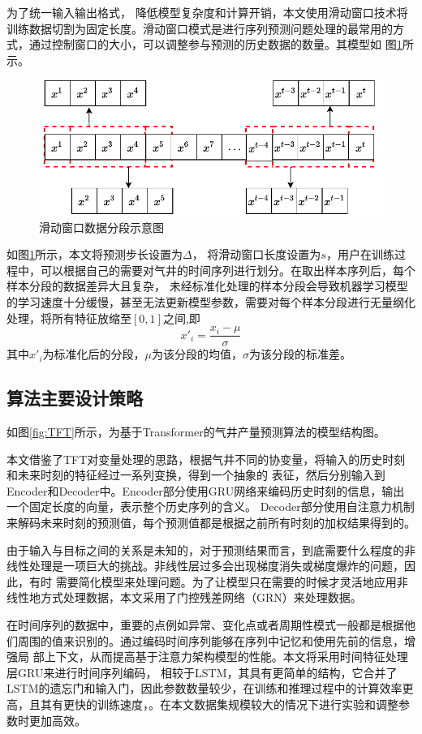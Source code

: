 为了统一输入输出格式，
降低模型复杂度和计算开销，本文使用滑动窗口技术将
训练数据切割为固定长度。滑动窗口模式是进行序列预测问题处理的最常用的方式，通过控制窗口的大小，可以调整参与预测的历史数据的数量。其模型如
图\ref{fig:slidewindow}所示。
\begin{figure}[H]
    \centering
    \includegraphics{figure/滑动窗口.vision.pdf}
    \caption{滑动窗口数据分段示意图}
    \label{fig:slidewindow}
\end{figure}
如图\ref{fig:slidewindow}所示，本文将预测步长设置为$\varDelta$， 将滑动窗口长度设置为$s$，用户在训练过程中，可以根据自己的需要对气井的时间序列进行划分。在取出样本序列后，每个样本分段的数据差异大且复杂，
未经标准化处理的样本分段会导致机器学习模型的学习速度十分缓慢，甚至无法更新模型参数，需要对每个样本分段进行无量纲化处理，将所有特征放缩至$[0,1]$之间,即
\begin{equation}
    x'_i = \frac{x_i - \mu}{\sigma}
\end{equation}
其中$x'_i$为标准化后的分段，$\mu$为该分段的均值，$\sigma$为该分段的标准差。
\subsection{算法主要设计策略}
如图\ref{fig:TFT}所示，为基于Transformer的气井产量预测算法的模型结构图。

本文借鉴了TFT对变量处理的思路，根据气井不同的协变量，将输入的历史时刻和未来时刻的特征经过一系列变换，得到一个抽象的
表征，然后分别输入到Encoder和Decoder中。Encoder部分使用GRU网络来编码历史时刻的信息，输出一个固定长度的向量，表示整个历史序列的含义。
Decoder部分使用自注意力机制来解码未来时刻的预测值，每个预测值都是根据之前所有时刻的加权结果得到的。

由于输入与目标之间的关系是未知的，对于预测结果而言，到底需要什么程度的非线性处理是一项巨大的挑战。非线性层过多会出现梯度消失或梯度爆炸的问题，因此，有时
需要简化模型来处理问题。为了让模型只在需要的时候才灵活地应用非线性地方式处理数据，本文采用了门控残差网络（GRN）来处理数据。

在时间序列的数据中，重要的点例如异常、变化点或者周期性模式一般都是根据他们周围的值来识别的。通过编码时间序列能够在序列中记忆和使用先前的信息，增强局
部上下文，从而提高基于注意力架构模型的性能。本文将采用时间特征处理层GRU来进行时间序列编码，
相较于LSTM，其具有更简单的结构，它合并了LSTM的遗忘门和输入门，因此参数数量较少，在训练和推理过程中的计算效率更高，且其有更快的训练速度，。在本文数据集规模较大的情况下进行实验和调整参数时更加高效。

